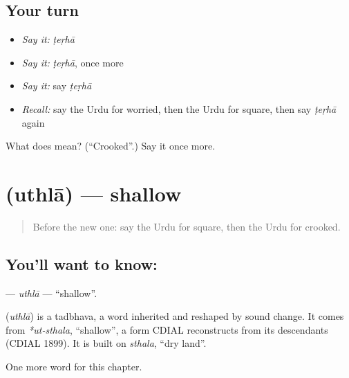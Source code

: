 \subsection*{Your turn}
\begin{itemize}
\raggedright
  \item \emph{Say it:} \emph{ṭeṛhā}
  \item \emph{Say it:} \emph{ṭeṛhā}, once more
  \item \emph{Say it:} say \emph{ṭeṛhā}
  \item \emph{Recall:} say the Urdu for worried, then the Urdu for square, then say \emph{ṭeṛhā} again
\end{itemize}

\begin{tcolorbox}[breakable,colback=teal!4,colframe=teal!35!black,title={Before you move on}]
What does  mean? (\textquotedblleft{}Crooked\textquotedblright{}.) Say it once more.
\end{tcolorbox}
\section[\texorpdfstring{\ur{اتھلا} (uthlā)}{اتھلا (uthlā)}]{ (uthlā) — shallow}

\label{lesson:UR-C194-uthla}



\begin{quote}
Before the new one: say the Urdu for square, then the Urdu for crooked.
\end{quote}

\subsection*{You'll want to know: }
\textbf{} — \emph{uthlā} — \textquotedblleft{}shallow\textquotedblright{}.

\begin{cousinweb}
\textbf{} (\emph{uthlā}) is a tadbhava, a word inherited and reshaped by sound change. It comes from \emph{*ut-sthala}, \textquotedblleft{}shallow\textquotedblright{}, a form CDIAL reconstructs from its descendants (CDIAL 1899). It is built on \emph{sthala}, \textquotedblleft{}dry land\textquotedblright{}.
\end{cousinweb}

\begin{grammarlens}[title={What you've built}]
One more word for this chapter.
\end{grammarlens}

